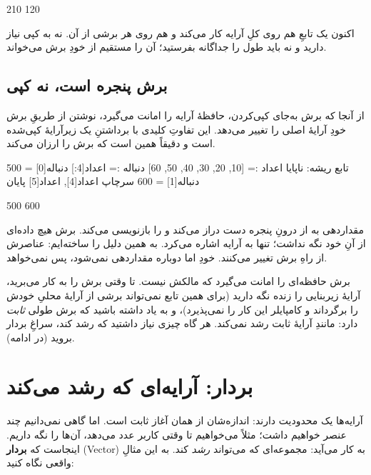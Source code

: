 \begin{progout}
210
120
\end{progout}

اکنون یک تابعِ  هم روی کلِ آرایه کار می‌کند و هم روی هر برشی از آن.
نه به کپی نیاز دارید و نه باید طول را جداگانه بفرستید؛  آن را مستقیم
از خودِ برش می‌خواند.

\subsection{برش پنجره است، نه کپی}

از آنجا که برش به‌جای کپی‌کردن، حافظهٔ آرایه را امانت می‌گیرد، نوشتن از طریقِ برش
خودِ آرایهٔ اصلی را تغییر می‌دهد. این تفاوتِ کلیدی با برداشتنِ یک زیرآرایهٔ کپی‌شده
است و دقیقاً همین است که برش را ارزان می‌کند.

\begin{salamfa}
تابع ریشه:
    ناپایا اعداد := [10, 20, 30, 40, 50, 60]
    دنباله := اعداد[4:]
    دنباله[0] = 500
    دنباله[1] = 600
    سرچاپ اعداد[4], اعداد[5]
پایان
\end{salamfa}

\begin{progout}
500 600
\end{progout}

مقداردهی به  از درونِ پنجره دست دراز می‌کند و  را
بازنویسی می‌کند. برش هیچ داده‌ای از آنِ خود نگه نداشت؛ تنها به آرایه اشاره می‌کرد.
به همین دلیل  را  ساخته‌ایم: عناصرش از راهِ برش تغییر
می‌کنند. خودِ  اما دوباره مقداردهی نمی‌شود، پس  نمی‌خواهد.

\begin{warn}
برش حافظه‌ای را امانت می‌گیرد که مالکش نیست. تا وقتی برش را به کار می‌برید، آرایهٔ
زیربنایی را زنده نگه دارید (برای همین تابع نمی‌تواند برشی از آرایهٔ محلیِ خودش را
برگرداند و کامپایلر این کار را نمی‌پذیرد)، و به یاد داشته باشید که برش طولی \emph{ثابت} دارد:
مانندِ آرایهٔ ثابت رشد نمی‌کند. هر گاه چیزی نیاز داشتید که رشد کند، سراغِ بردار
بروید (در ادامه).
\end{warn}

\section{بردار: آرایه‌ای که رشد می‌کند}

آرایه‌ها یک محدودیت دارند: اندازه‌شان از همان آغاز ثابت است. اما گاهی نمی‌دانیم
چند عنصر خواهیم داشت؛ مثلاً می‌خواهیم تا وقتی کاربر عدد می‌دهد، آن‌ها را نگه
داریم. اینجاست که \textbf{بردار} (Vector) به کار می‌آید: مجموعه‌ای که می‌تواند
\emph{رشد} کند. به این مثالِ واقعی نگاه کنید:

